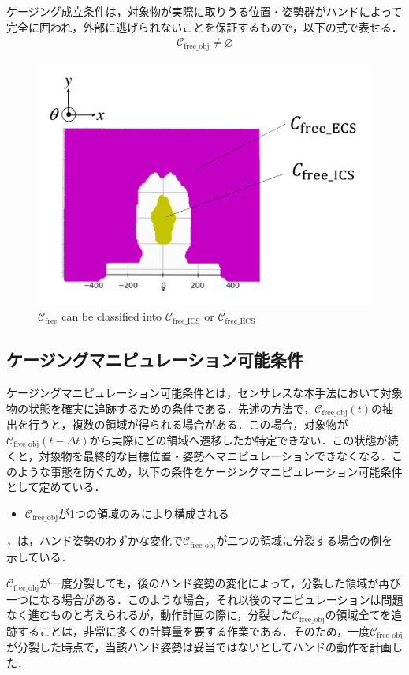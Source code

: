 \documentclass[a4paper,twoside,12pt,papersize, dvipdfmx]{iirthesis}
\begin{document}
ケージング成立条件は，対象物が実際に取りうる位置・姿勢群がハンドによって完全に囲われ，外部に逃げられないことを保証するもので，以下の式で表せる．
\begin{gather}
\mathcal{C}_{\mathrm{free\_obj}} \neq \varnothing
\end{gather}

\begin{figure}[hb]
\centering
\includegraphics[width=0.6\hsize]{fig/2-sensorless-icm/cfree_ics.pdf}
\caption{$\mathcal{C}_{\mathrm{free}}$ can be classified into $\mathcal{C}_{\mathrm{free\_ICS}}$ or $\mathcal{C}_{\mathrm{free\_ECS}}$ \cite{komiyama2021}}\label{fig::sicm::cfreeics}
\end{figure}

\clearpage
\subsection*{ケージングマニピュレーション可能条件}
ケージングマニピュレーション可能条件とは，センサレスな本手法において対象物の状態を確実に追跡するための条件である．先述の方法で，$\mathcal{C}_{\mathrm{free\_obj}}(t)$の抽出を行うと，複数の領域が得られる場合がある．この場合，対象物が$\mathcal{C}_{\mathrm{free\_obj}}(t-\Delta t)$から実際にどの領域へ遷移したか特定できない．この状態が続くと，対象物を最終的な目標位置・姿勢へマニピュレーションできなくなる．このような事態を防ぐため，以下の条件をケージングマニピュレーション可能条件として定めている．
\begin{itemize}
\item $\mathcal{C}_{\mathrm{free\_obj}}$が1つの領域のみにより構成される
\end{itemize}

，は，ハンド姿勢のわずかな変化で$\mathcal{C}_{\mathrm{free\_obj}}$が二つの領域に分裂する場合の例を示している．\par
$\mathcal{C}_{\mathrm{free\_obj}}$が一度分裂しても，後のハンド姿勢の変化によって，分裂した領域が再び一つになる場合がある．このような場合，それ以後のマニピュレーションは問題なく進むものと考えられるが，動作計画の際に，分裂した$\mathcal{C}_{\mathrm{free\_obj}}$の領域全てを追跡することは，非常に多くの計算量を要する作業である．そのため，一度$\mathcal{C}_{\mathrm{free\_obj}}$が分裂した時点で，当該ハンド姿勢は妥当ではないとしてハンドの動作を計画した．
\end{document}
